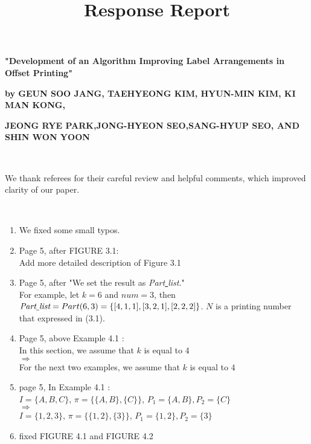 \documentclass[10pt]{amsart}
\begin{document}
\title[Response Report]
{Response Report}
\maketitle
\centerline{\bf "Development of an Algorithm Improving Label Arrangements in Offset Printing"}
\centerline{\bf by GEUN SOO JANG, TAEHYEONG KIM, HYUN-MIN KIM, KI MAN KONG,}
\centerline{\bf  JEONG RYE PARK,JONG-HYEON SEO,SANG-HYUP SEO, AND SHIN WON YOON}

\

We thank referees for their careful review and helpful comments, which improved clarity of our paper.

\

\begin{enumerate}

\item We fixed some small typos.\\

\item Page 5, after FIGURE 3.1:\\
Add more detailed description of Figure 3.1\\

\item Page 5, after "We set the result as {\it Part\underline{ }list}."\\
For example, let $k=6$ and $num=3$, then $\text{\it Part\underline{ }list}={Part}(6, 3) = \{ [4,1,1],[3,2,1],[2,2,2] \}$.
$N$ is a printing number that expressed in (3.1).\\

\item Page 5, above Example 4.1 : \\
In this section, we assume that $k$ is equal to $4$\\
$\Longrightarrow$\\
For the next two examples, we assume that $k$ is equal to $4$\\

\item page 5, In Example 4.1 : \\
$I=\{A,B,C\}$,  $\pi = \{\{A,B\}, \{C\}\}$, $P_{1} = \{A,B\}, P_{2} = \{C\}$\\
$\Longrightarrow$\\
$I=\{1,2,3\}$,  $\pi = \{\{1,2\}, \{3\}\}$, $P_{1} = \{1,2\}, P_{2} = \{3\}$\\

\item fixed FIGURE 4.1 and FIGURE 4.2 \\



\end{enumerate}
\end{document}
